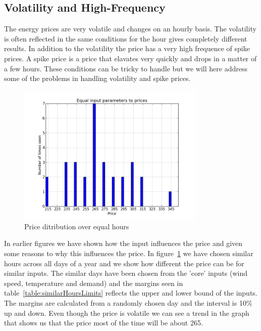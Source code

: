 \subsection{Volatility and High-Frequency}
The energy prices are very volatile and changes on an hourly basis. The volatility is often reflected in the same conditions for the hour gives completely different results. In addition to the volatility the price has a very high frequence of spike prices. A spike price is a price that elavates very quickly and drops in a matter of a few hours. These conditions can be tricky to handle but we will here address some of the problems in handling volatility and spike prices.

\begin{figure}[H]
\centering
\includegraphics[width=0.8\textwidth ]{billeder/energy_price_plots/same_hour_distribution.png}
\caption{Price ditribution over equal hours}
\label{fig:same_hour_distribution}
\end{figure}

In earlier figures we have shown how the input influences the price and given some reasons to why this influences the price. In figure~\ref{fig:same_hour_distribution} we have chosen similar hours across all days of a year and we show how different the price can be for similar inputs. The similar days have been chosen from the 'core' inputs (wind speed, temperature and demand) and the margins seen in table~\ref{table:similarHoursLimits} reflects the upper and lower bound of the inputs. The margins are calculated from a randomly chosen day and the interval is 10\% up and down. Even though the price is volatile we can see a trend in the graph that shows us that the price most of the time will be about 265.

